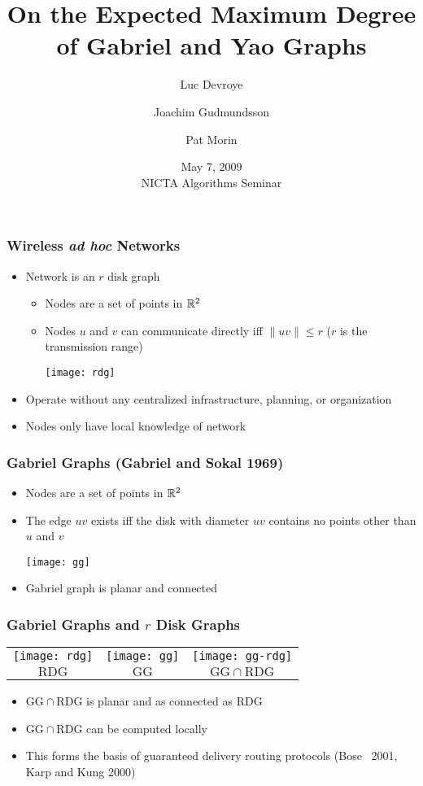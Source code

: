 \documentclass{beamer}
\title{On the Expected Maximum Degree \\ 
	of Gabriel and Yao Graphs}
\author{Luc Devroye 
	\and Joachim Gudmundsson
	\and Pat Morin}
\date{May 7, 2009 \\ NICTA Algorithms Seminar}
\newcommand{\GG}{\mathrm{GG}}
\newcommand{\RDG}{\mathrm{RDG}}
\begin{document}
\frame{\titlepage}


\frame
{
  \frametitle{Wireless \emph{ad hoc} Networks}
  \begin{itemize}
    \item Network is an $r$ disk graph
    \begin{itemize}
      \item Nodes are a set of points in $\mathbb{R}^2$
      \item Nodes $u$ and $v$ can communicate directly iff $\|uv\|\le r$  
    	($r$ is the transmission range)
      \begin{center}
	\texttt{[image: rdg]}
      \end{center}
    \end{itemize}
    \item Operate without any centralized infrastructure, 
  	planning, or organization
    \item Nodes only have local knowledge of network
  \end{itemize}
}

\frame
{
  \frametitle{Gabriel Graphs (Gabriel and Sokal 1969)}
  \begin{itemize}
    \item Nodes are a set of points in $\mathbb{R}^2$
    \item The edge $uv$ exists iff the disk with diameter $uv$ contains
            no points other than $u$ and $v$
    \begin{center}
      \texttt{[image: gg]}
    \end{center}
  \item Gabriel graph is planar and connected
  \end{itemize}
}

\frame
{
  \frametitle{Gabriel Graphs and $r$ Disk Graphs}
  \begin{center}
    \begin{tabular}{ccc}
      \texttt{[image: rdg]} 
           & \texttt{[image: gg]} 
           &  \texttt{[image: gg-rdg]} \\
      $\RDG$ & $\GG$ & $\GG\cap\RDG$
    \end{tabular}
  \end{center}
  \begin{itemize}
    \item $\GG\cap\RDG$ is planar and as connected as $\RDG$
    \item $\GG\cap\RDG$ can be computed locally
    \item This forms the basis of guaranteed delivery routing protocols
          (Bose \etal\ 2001, Karp and Kung 2000)
  \end{itemize}
}
\end{document}
